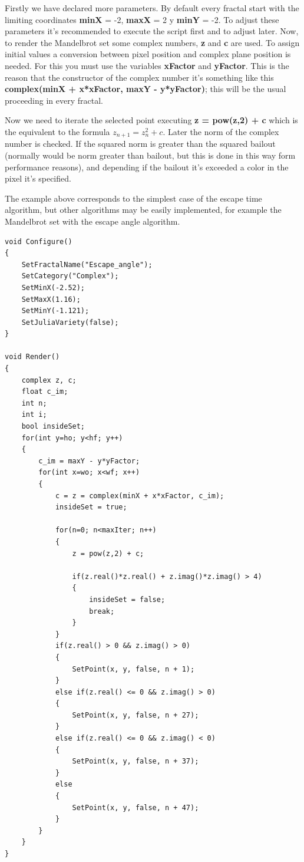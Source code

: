 \documentclass[oneside]{book}
\begin{document}
Firstly we have declared more parameters. By default every fractal start with the limiting coordinates \textbf{minX} = -2, \textbf{maxX} = 2 y \textbf{minY} = -2. To adjust these parameters it's recommended to execute the script first and to adjust later. Now, to render the Mandelbrot set some complex numbers, \textbf{z} and \textbf{c} are used. To assign initial values a conversion between pixel position and complex plane position is needed. For this you must use the variables \textbf{xFactor} and \textbf{yFactor}. This is the reason that the constructor of the complex number it's something like this \textbf{complex(minX + x*xFactor, maxY - y*yFactor)}; this will be the usual proceeding in every fractal.

Now we need to iterate the selected point executing \textbf{z = pow(z,2) + c} which is the equivalent to the formula $z_{n+1} = z_n^2 + c$. Later the norm of the complex number is checked. If the squared norm is greater than the squared bailout (normally would be norm greater than bailout, but this is done in this way form performance reasons), and depending if the bailout it's exceeded a color in the pixel it's specified.

The example above corresponds to the simplest case of the escape time algorithm, but other algorithms may be easily implemented, for example the Mandelbrot set with the escape angle algorithm.

\begin{lstlisting}
void Configure()
{
	SetFractalName("Escape_angle");
	SetCategory("Complex");
	SetMinX(-2.52);
	SetMaxX(1.16);
	SetMinY(-1.121);
	SetJuliaVariety(false);
}

void Render()
{
	complex z, c;
	float c_im;
	int n;
	int i;
	bool insideSet;
	for(int y=ho; y<hf; y++)
	{
		c_im = maxY - y*yFactor;
		for(int x=wo; x<wf; x++)
		{
			c = z = complex(minX + x*xFactor, c_im);
			insideSet = true;

			for(n=0; n<maxIter; n++)
			{
				z = pow(z,2) + c;
				
				if(z.real()*z.real() + z.imag()*z.imag() > 4)
				{
					insideSet = false;
					break;
				}
			}
			if(z.real() > 0 && z.imag() > 0)
			{
				SetPoint(x, y, false, n + 1);
			}
			else if(z.real() <= 0 && z.imag() > 0)
			{
				SetPoint(x, y, false, n + 27);
			}
			else if(z.real() <= 0 && z.imag() < 0)
			{
				SetPoint(x, y, false, n + 37);
			}
			else
			{
				SetPoint(x, y, false, n + 47);
			}
		}
	}
}
\end{lstlisting}
\end{document}
